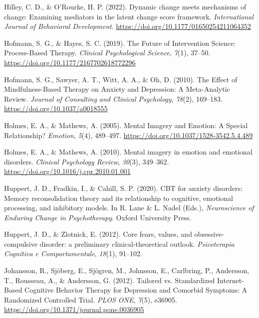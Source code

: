 \documentclass[
  man,floatsintext]{apa7}
\newlength{\cslhangindent}
\newlength{\cslentryspacingunit} %
\newenvironment{CSLReferences}[2] %
 {%
  \setlength{\parindent}{0pt}
  \ifodd #1
  \let\oldpar\par
  \def\par{\hangindent=\cslhangindent\oldpar}
  \fi
  \setlength{\parskip}{#2\cslentryspacingunit}
 }%
 {}
\begin{document}
\begin{CSLReferences}{1}{0}
\leavevmode{}%
Hilley, C. D., \& O'Rourke, H. P. (2022). Dynamic change meets mechanisms of change: Examining mediators in the latent change score framework. \emph{International Journal of Behavioral Development}. \url{https://doi.org/10.1177/01650254211064352}

\leavevmode{}%
Hofmann, S. G., \& Hayes, S. C. (2019). The Future of Intervention Science: Process-Based Therapy. \emph{Clinical Psychological Science}, \emph{7}(1), 37--50. \url{https://doi.org/10.1177/2167702618772296}

\leavevmode{}%
Hofmann, S. G., Sawyer, A. T., Witt, A. A., \& Oh, D. (2010). The Effect of Mindfulness-Based Therapy on Anxiety and Depression: A Meta-Analytic Review. \emph{Journal of Consulting and Clinical Psychology}, \emph{78}(2), 169--183. \url{https://doi.org/10.1037/a0018555}

\leavevmode{}%
Holmes, E. A., \& Mathews, A. (2005). Mental Imagery and Emotion: A Special Relationship? \emph{Emotion}, \emph{5}(4), 489--497. \url{https://doi.org/10.1037/1528-3542.5.4.489}

\leavevmode{}%
Holmes, E. A., \& Mathews, A. (2010). Mental imagery in emotion and emotional disorders. \emph{Clinical Psychology Review}, \emph{30}(3), 349--362. \url{https://doi.org/10.1016/j.cpr.2010.01.001}

\leavevmode{}%
Huppert, J. D., Fradkin, I., \& Cahill, S. P. (2020). CBT for anxiety disorders: Memory reconsolidation theory and its relationship to cognitive, emotional processing, and inhibitory models. In R. Lane \& L. Nadel (Eds.), \emph{Neuroscience of Enduring Change in Psychotherapy}. Oxford University Press.

\leavevmode{}%
Huppert, J. D., \& Zlotnick, E. (2012). Core fears, values, and obsessive-compulsive disorder: a preliminary clinical-theoretical outlook. \emph{Psicoterapia Cognitiva e Comportamentale}, \emph{18}(1), 91--102.

\leavevmode{}%
Johansson, R., Sjöberg, E., Sjögren, M., Johnsson, E., Carlbring, P., Andersson, T., Rousseau, A., \& Andersson, G. (2012). Tailored vs. Standardized Internet-Based Cognitive Behavior Therapy for Depression and Comorbid Symptoms: A Randomized Controlled Trial. \emph{PLOS ONE}, \emph{7}(5), e36905. \url{https://doi.org/10.1371/journal.pone.0036905}


\end{CSLReferences}
\end{document}
